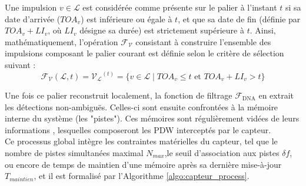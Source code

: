 Une impulsion $v \in \mathcal{L}$ est considérée comme présente sur le palier à l'instant $t$ si sa date d'arrivée ($TOA_v$) est inférieure ou égale à $t$, et que sa date de fin (définie par $TOA_v + LI_v$, où $LI_v$ désigne sa durée) est strictement supérieure à $t$. Ainsi, mathématiquement, l'opération $\mathcal{F}_{\mathcal{V}}$ consistant à construire l'ensemble des impulsions composant le palier courant est définie selon le critère de sélection suivant :
\begin{equation}
\mathcal{F}_{\mathcal{V}}(\mathcal{L}, t) = \mathcal{V_L}^{(t)} = \{ v \in \mathcal{L} \mid TOA_v \le t \text{ et } TOA_v + LI_v > t \}
\end{equation}

Une fois ce palier reconstruit localement, la fonction de filtrage $\mathcal{F}_{\mathrm{DNA}}$ en extrait les détections non-ambiguës. Celles-ci sont ensuite confrontées à la mémoire interne du système (les "pistes"). Ces mémoires sont régulièrement vidées de leurs informations , lesquelles composeront les PDW interceptés par le capteur.\\

Ce processus global intègre les contraintes matérielles du capteur, tel que le nombre de pistes simultanées maximal $N_{max}$,le seuil d'association aux pistes $\delta f$, ou encore de temps de maintien d'une mémoire après sa dernière mise-à-jour $T_{maintien}$, et il est formalisé par l'Algorithme \ref{algo:capteur_process}. 

